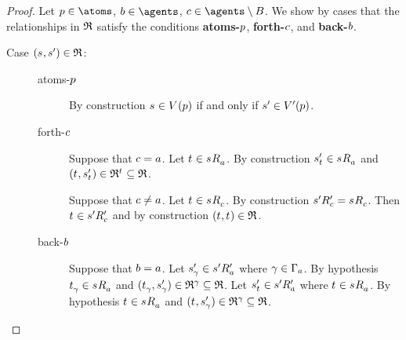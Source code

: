 \begin{proof}
Let $\atomP \in \atoms$, $\agentB \in \agents$, $\agentC \in \agents \setminus \agentsB$.
We show by cases that the relationships in $\mathfrak{R}$ satisfy the conditions {\bf atoms-$p$}, {\bf forth-$c$}, and {\bf back-$b$}.

\begin{description}
    \item[Case $(\kStateS, \kStateSP) \in \refinement$:]
        \hfill
        \begin{description}
            \item[atoms-$p$] 
                By construction $\kStateS \in \kValuation(\atomP)$ if and only if ${s}^{\prime} \in {V^{\prime}}(p)$.
            \item[forth-$c$]
                Suppose that $c = a$.
                Let $\kStateT \in \kSuccessorsA{\kStateS}$.
                By construction $\kStateSP_{\kStateT} \in \kSuccessorsA{\kStateS}$ and $(\kStateT, \kStateSP_{\kStateT}) \in \refinement^{\kStateT} \subseteq \refinement$.

                Suppose that $c \neq a$.
                Let $\kStateT \in \kSuccessorsC{\kStateS}$.
                By construction $\kSuccessorsPC{\kStateSP} = \kSuccessorsC{\kStateS}$.
                Then $\kStateT \in \kSuccessorsPC{\kStateSP}$ and by construction $(\kStateT, \kStateT) \in \refinement$.
            \item[back-$b$]
                Suppose that $b = a$.
                Let ${s}^{\prime}_\gamma \in {{s}^{\prime}} {R^{\prime}_{a}}$ where $\gamma \in \Gamma_a$.
                By hypothesis $\kStateT_\gamma \in \kSuccessorsA{\kStateS}$ and $(\kStateT_\gamma, \kStateSP_\gamma) \in \refinement^\gamma \subseteq \refinement$.
                Let $\kStateSP_{\kStateT} \in \kSuccessorsPA{\kStateSP}$ where $\kStateT \in \kSuccessorsA{\kStateS}$.
                By hypothesis $\kStateT \in \kSuccessorsA{\kStateS}$ and $(\kStateT, \kStateSP_\gamma) \in \refinement^\gamma \subseteq \refinement$.


\end{description}
\end{description}
\end{proof}
